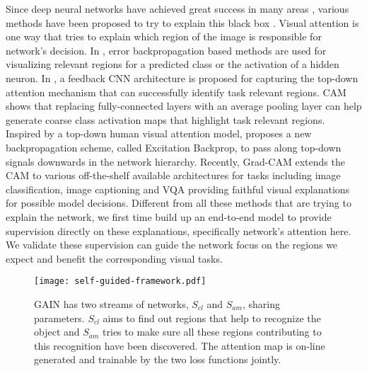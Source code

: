 \documentclass[10pt,twocolumn,letterpaper]{article}
\begin{document}
Since deep neural networks have achieved great success in many areas \cite{gong2017learning,zhang2017image}, various methods have been proposed to try to explain this black box \cite{simonyan2013deep,zeiler2014visualizing,cao2015look,zhou2014object,zhang2017mdnet}. Visual attention is one way that tries to explain which region of the image is responsible for network's decision. In \cite{simonyan2013deep,zeiler2014visualizing,springenberg2015striving}, error backpropagation based methods are used for visualizing relevant regions for a predicted class or the activation of a hidden neuron. In \cite{cao2015look}, a feedback CNN architecture is proposed for capturing the top-down attention mechanism that can successfully identify task relevant regions. CAM \cite{zhou2016learning} shows that replacing fully-connected layers with an average pooling layer can help generate coarse class activation maps that highlight task relevant regions. Inspired by a top-down human visual attention model, \cite{zhang2016top} proposes a new backpropagation scheme, called Excitation Backprop, to pass along top-down signals downwards in the network hierarchy. Recently, Grad-CAM \cite{grad-cam} extends the CAM to various off-the-shelf available architectures for tasks including image classification, image captioning and VQA providing faithful visual explanations for possible model decisions. Different from all these methods that are trying to explain the network, we first time build up an end-to-end model to provide supervision directly on these explanations, specifically network's attention here. We validate these supervision can guide the network focus on the regions we expect and benefit the corresponding visual tasks.


\begin{figure*}%
\centering
\texttt{[image: self-guided-framework.pdf]} %
\caption{GAIN has two streams of networks, ${S_{cl}}$ and ${S_{am}}$, sharing parameters. ${S_{cl}}$ aims to find out regions that help to recognize the object and ${S_{am}}$ tries to make sure all these regions contributing to this recognition have been discovered. The attention map is on-line generated and trainable by the two loss functions jointly.}
\label{fig:self_supervised}
\end{figure*}
\end{document}
